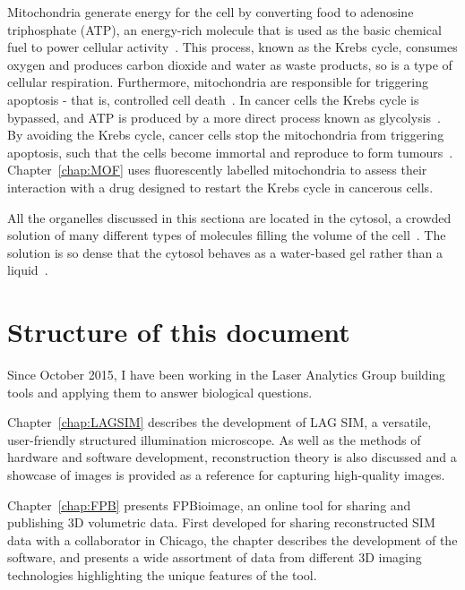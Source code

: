 Mitochondria generate energy for the cell by converting food to adenosine triphosphate (ATP), an energy-rich molecule that is used as the basic chemical fuel to power cellular activity~\cite{alberts2013essential}. 
This process, known as the Krebs cycle, consumes oxygen and produces carbon dioxide and water as waste products, so is a type of cellular respiration. 
Furthermore, mitochondria are responsible for triggering apoptosis - that is, controlled cell death~\cite{murray1993cell}. 
In cancer cells the Krebs cycle is bypassed, and ATP is produced by a more direct process known as glycolysis~\cite{warburg1930uber}. 
By avoiding the Krebs cycle, cancer cells stop the mitochondria from triggering apoptosis, such that the cells become immortal and reproduce to form tumours~\cite{murray1993cell}. 
Chapter~\ref{chap:MOF} uses fluorescently labelled  mitochondria to assess their interaction with a drug designed to restart the Krebs cycle in cancerous cells. 

All the organelles discussed in this sectiona are located in the cytosol, a crowded solution of many different types of molecules filling the volume of the cell~\cite{goodsell1991inside}. 
The solution is so dense that the cytosol behaves as a water-based gel rather than a liquid~\cite{alberts2013essential}. 



\section{Structure of this document}
Since October 2015, I have been working in the Laser Analytics Group building tools and applying them to answer biological questions. 

Chapter~\ref{chap:LAGSIM} describes the development of LAG SIM, a versatile, user-friendly structured illumination microscope. 
As well as the methods of hardware and software development, reconstruction theory is also discussed and a showcase of images is provided as a reference for capturing high-quality images. 

Chapter~\ref{chap:FPB} presents FPBioimage, an online tool for sharing and publishing 3D volumetric data. 
First developed for sharing reconstructed SIM data with a collaborator in Chicago, the chapter describes the development of the software, and presents a wide assortment of data from different 3D imaging technologies highlighting the unique features of the tool. 

